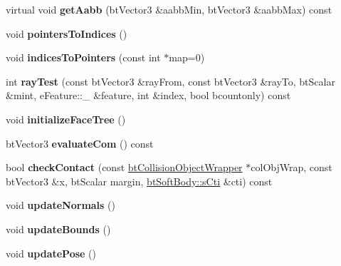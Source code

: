 \begin{DoxyCompactItemize}
\item 
\mbox{\label{classbtSoftBody_ada0bc2f7118e153decdf7f30022b0748}} 
virtual void {\bfseries get\+Aabb} (bt\+Vector3 \&aabb\+Min, bt\+Vector3 \&aabb\+Max) const
\item 
\mbox{\label{classbtSoftBody_ab0c0d590f7b945029af1f5afc26b58ab}} 
void {\bfseries pointers\+To\+Indices} ()
\item 
\mbox{\label{classbtSoftBody_ae7d0c0ae69ea5801118a049f590fe703}} 
void {\bfseries indices\+To\+Pointers} (const int $\ast$map=0)
\item 
\mbox{\label{classbtSoftBody_a26360c6f5957a82867f2b26343d30910}} 
int {\bfseries ray\+Test} (const bt\+Vector3 \&ray\+From, const bt\+Vector3 \&ray\+To, bt\+Scalar \&mint, e\+Feature\+::\+\_\+ \&feature, int \&index, bool bcountonly) const
\item 
\mbox{\label{classbtSoftBody_af92f269650f4235df9d8923e729a515a}} 
void {\bfseries initialize\+Face\+Tree} ()
\item 
\mbox{\label{classbtSoftBody_a5fa35a89d93a02ef3cdb9e8fe63e166e}} 
bt\+Vector3 {\bfseries evaluate\+Com} () const
\item 
\mbox{\label{classbtSoftBody_ae6de42ab5abf38182558d387c03fd0da}} 
bool {\bfseries check\+Contact} (const \hyperlink{structbtCollisionObjectWrapper}{bt\+Collision\+Object\+Wrapper} $\ast$col\+Obj\+Wrap, const bt\+Vector3 \&x, bt\+Scalar margin, \hyperlink{structbtSoftBody_1_1sCti}{bt\+Soft\+Body\+::s\+Cti} \&cti) const
\item 
\mbox{\label{classbtSoftBody_ab362c5aca67e90032065945ce15cff31}} 
void {\bfseries update\+Normals} ()
\item 
\mbox{\label{classbtSoftBody_aee48603cdeeb5cee57f6a210b135294b}} 
void {\bfseries update\+Bounds} ()
\item 
\mbox{\label{classbtSoftBody_ac13d11fd5d294ce8924751b99d431c1c}} 
void {\bfseries update\+Pose} ()
\item 

\end{DoxyCompactItemize}
